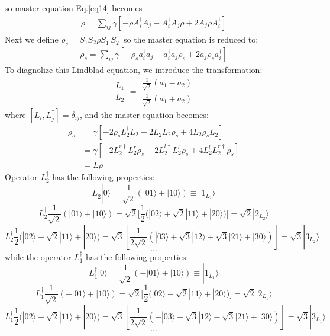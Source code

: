 \documentclass{article}
\begin{document}
so master equation Eq.\eqref{eq14} becomes
\begin{equation}
\label{eq16}
\begin{split}
\dot{\rho}=\sum_{ij}\gamma[-\rho A_{i}^{\dagger}A_{j}-A_{i}^{\dagger}A_{j}\rho+2A_{j}\rho A_{i}^{\dagger}]
\end{split}
\end{equation}
Next we define $ \rho_{s}=S_{1}S_{2}\dot{\rho S_{1}^{+}S_{2}^{+}}$ so the master equation is reduced to:
\begin{equation}
\label{eq17}
\begin{split}
\dot{\rho_{s}}=\sum_{ij}\gamma[-\rho_{s}a_{i}^{\dagger}a_{j}-a_{i}^{\dagger}a_{j}\rho_{s}+2a_{j}\rho_{s}a_{i}^{\dagger}]
\end{split}
\end{equation}
To diagnolize this Lindblad equation, we introduce the transformation: $$\begin{array}{c}
L_{1}\\
L_{2}
\end{array}=\begin{array}{c}
\frac{1}{\sqrt{2}}(a_{1}-a_{2})\\
\frac{1}{\sqrt{2}}(a_{1}+a_{2})
\end{array}$$
where $[L_{i},L_{j}^{\dagger}]=\delta_{ij}$, and the master equation becomes:
\begin{equation}
\label{eq18}
\begin{split}
\dot{\rho_{s}}&=\gamma[-2\rho_{s}L_{2}^{\dagger}L_{2}-2L_{2}^{\dagger}L_{2}\rho_{s}+4L_{2}\rho_{s}L_{2}^{\dagger}]\\
&=\gamma[-2L_{2}^{r\dagger}L_{2}^{r}\rho_{s}-2L_{2}^{l\dagger}L_{2}^{l}\rho_{s}+4L_{2}^{l}L_{2}^{r\dagger}\rho_{s}]\\
&=L\rho
\end{split}
\end{equation}
Operator $L_2^{\dagger}$ has the following properties: $$L_{2}^{\dagger}|0\rangle=\frac{1}{\sqrt{2}}(|01\rangle+|10\rangle)\equiv|1_{L_2}\rangle$$ $$L_{2}^{\dagger}\frac{1}{\sqrt{2}}(|01\rangle+|10\rangle)=\sqrt{2}[\frac{1}{2}(|02\rangle+\sqrt{2}|11\rangle+|20\rangle)]=\sqrt{2}|2_{L_2}\rangle$$  $$L_{2}^{\dagger}\frac{1}{2}(|02\rangle+\sqrt{2}|11\rangle+|20\rangle)=\sqrt{3}[\frac{1}{2\sqrt{2}}(|03\rangle+\sqrt{3}|12\rangle+\sqrt{3}|21\rangle+|30\rangle)]=\sqrt{3}|3_{L_2}\rangle$$  $$...$$
while the operator $L_1^{\dagger}$ has the following properties: $$L_{1}^{\dagger}|0\rangle=\frac{1}{\sqrt{2}}(-|01\rangle+|10\rangle)\equiv|1_{L_{1}}\rangle$$ $$L_{1}^{\dagger}\frac{1}{\sqrt{2}}(-|01\rangle+|10\rangle)=\sqrt{2}[\frac{1}{2}(|02\rangle-\sqrt{2}|11\rangle+|20\rangle)]=\sqrt{2}|2_{L_{1}}\rangle$$  $$L_{1}^{\dagger}\frac{1}{2}(|02\rangle-\sqrt{2}|11\rangle+|20\rangle)=\sqrt{3}[\frac{1}{2\sqrt{2}}(-|03\rangle+\sqrt{3}|12\rangle-\sqrt{3}|21\rangle+|30\rangle)]=\sqrt{3}|3_{L_{1}}\rangle$$  $$...$$
\end{document}
